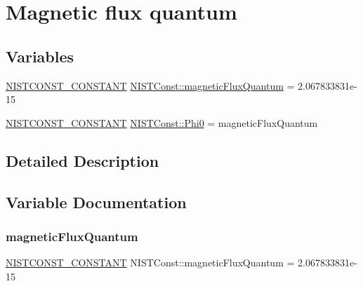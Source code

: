 \hypertarget{group___n_i_s_t_const-_magnetic_flux_quantum}{}\section{Magnetic flux quantum}
\label{group___n_i_s_t_const-_magnetic_flux_quantum}
\subsection*{Variables}
\begin{DoxyCompactItemize}
\item 
\mbox{\hyperlink{group___n_i_s_t_const-_macros_ga2b0fc1d7452373f816175dd86ce26729}{N\+I\+S\+T\+C\+O\+N\+S\+T\+\_\+\+C\+O\+N\+S\+T\+A\+NT}} \mbox{\hyperlink{group___n_i_s_t_const-_magnetic_flux_quantum_gade84700a3e9c0f4759560353e2da4dde}{N\+I\+S\+T\+Const\+::magnetic\+Flux\+Quantum}} = 2.\+067833831e-\/15
\item 
\mbox{\hyperlink{group___n_i_s_t_const-_macros_ga2b0fc1d7452373f816175dd86ce26729}{N\+I\+S\+T\+C\+O\+N\+S\+T\+\_\+\+C\+O\+N\+S\+T\+A\+NT}} \mbox{\hyperlink{group___n_i_s_t_const-_magnetic_flux_quantum_ga7319d9ef42b2a4a6c6047ee1d0c3eaed}{N\+I\+S\+T\+Const\+::\+Phi0}} = magnetic\+Flux\+Quantum
\end{DoxyCompactItemize}


\subsection{Detailed Description}


\subsection{Variable Documentation}
\mbox{\label{group___n_i_s_t_const-_magnetic_flux_quantum_gade84700a3e9c0f4759560353e2da4dde}} 
\subsubsection{\texorpdfstring{magnetic\+Flux\+Quantum}{magneticFluxQuantum}}
{\footnotesize\ttfamily \mbox{\hyperlink{group___n_i_s_t_const-_macros_ga2b0fc1d7452373f816175dd86ce26729}{N\+I\+S\+T\+C\+O\+N\+S\+T\+\_\+\+C\+O\+N\+S\+T\+A\+NT}} N\+I\+S\+T\+Const\+::magnetic\+Flux\+Quantum = 2.\+067833831e-\/15}

